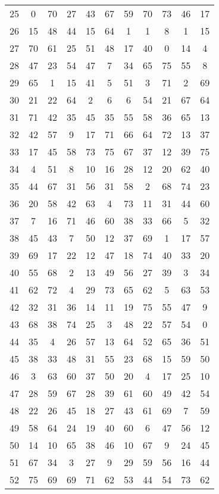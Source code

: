 \begin{table}
\begin{tabular}{c c c c c c c c c c c }
25 & 0 & 70 & 27 & 43 & 67 & 59 & 70 & 73 & 46 & 17 \\
26 & 15 & 48 & 44 & 15 & 64 & 1 & 1 & 8 & 1 & 15 \\
27 & 70 & 61 & 25 & 51 & 48 & 17 & 40 & 0 & 14 & 4 \\
28 & 47 & 23 & 54 & 47 & 7 & 34 & 65 & 75 & 55 & 8 \\
29 & 65 & 1 & 15 & 41 & 5 & 51 & 3 & 71 & 2 & 69 \\
30 & 21 & 22 & 64 & 2 & 6 & 6 & 54 & 21 & 67 & 64 \\
31 & 71 & 42 & 35 & 45 & 35 & 55 & 58 & 36 & 65 & 13 \\
32 & 42 & 57 & 9 & 17 & 71 & 66 & 64 & 72 & 13 & 37 \\
33 & 17 & 45 & 58 & 73 & 75 & 67 & 37 & 12 & 39 & 75 \\
34 & 4 & 51 & 8 & 10 & 16 & 28 & 12 & 20 & 62 & 40 \\
35 & 44 & 67 & 31 & 56 & 31 & 58 & 2 & 68 & 74 & 23 \\
36 & 20 & 58 & 42 & 63 & 4 & 73 & 11 & 31 & 44 & 60 \\
37 & 7 & 16 & 71 & 46 & 60 & 38 & 33 & 66 & 5 & 32 \\
38 & 45 & 43 & 7 & 50 & 12 & 37 & 69 & 1 & 17 & 57 \\
39 & 69 & 17 & 22 & 12 & 47 & 18 & 74 & 40 & 33 & 20 \\
40 & 55 & 68 & 2 & 13 & 49 & 56 & 27 & 39 & 3 & 34 \\
41 & 62 & 72 & 4 & 29 & 73 & 65 & 62 & 5 & 63 & 53 \\
42 & 32 & 31 & 36 & 14 & 11 & 19 & 75 & 55 & 47 & 9 \\
43 & 68 & 38 & 74 & 25 & 3 & 48 & 22 & 57 & 54 & 0 \\
44 & 35 & 4 & 26 & 57 & 13 & 64 & 52 & 65 & 36 & 51 \\
45 & 38 & 33 & 48 & 31 & 55 & 23 & 68 & 15 & 59 & 50 \\
46 & 3 & 63 & 60 & 37 & 50 & 20 & 4 & 17 & 25 & 10 \\
47 & 28 & 59 & 67 & 28 & 39 & 61 & 60 & 49 & 42 & 54 \\
48 & 22 & 26 & 45 & 18 & 27 & 43 & 61 & 69 & 7 & 59 \\
49 & 58 & 64 & 24 & 19 & 40 & 60 & 6 & 47 & 56 & 12 \\
50 & 14 & 10 & 65 & 38 & 46 & 10 & 67 & 9 & 24 & 45 \\
51 & 67 & 34 & 3 & 27 & 9 & 29 & 59 & 56 & 16 & 44 \\
52 & 75 & 69 & 69 & 71 & 62 & 53 & 44 & 54 & 73 & 62 \\

\end{tabular}
\end{table}
